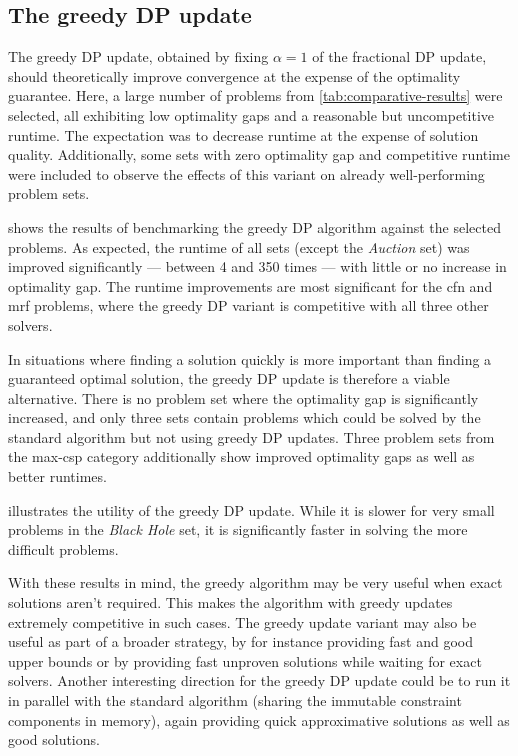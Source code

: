 \subsection{The greedy DP update}
The greedy DP update, obtained by fixing \(\alpha=1\) of the fractional DP update, should theoretically improve convergence at the expense of the optimality guarantee.
Here, a large number of problems from \cref{tab:comparative-results} were selected, all exhibiting low optimality gaps and a reasonable but uncompetitive runtime.
The expectation was to decrease runtime at the expense of solution quality.
Additionally, some sets with zero optimality gap and competitive runtime were included to observe the effects of this variant on already well-performing problem sets.

 shows the results of benchmarking the greedy DP algorithm against the selected problems.
As expected, the runtime of all sets (except the \emph{Auction} set) was improved significantly --- between \num{4} and \num{350} times --- with little or no increase in optimality gap.
The runtime improvements are most significant for the \gls{cfn} and \gls{mrf} problems, where the greedy DP variant is competitive with all three other solvers.

In situations where finding a solution quickly is more important than finding a guaranteed optimal solution, the greedy DP update is therefore a viable alternative.
There is no problem set where the optimality gap is significantly increased, and only three sets contain problems which could be solved by the standard algorithm but not using greedy DP updates.
Three problem sets from the max-\gls{csp} category additionally show improved optimality gaps as well as better runtimes.

 illustrates the utility of the greedy DP update.
While it is slower for very small problems in the \emph{Black Hole} set, it is significantly faster in solving the more difficult problems.


With these results in mind, the greedy algorithm may be very useful when exact solutions aren't required.
This makes the algorithm with greedy updates extremely competitive in such cases.
The greedy update variant may also be useful as part of a broader strategy, by for instance providing fast and good upper bounds or by providing fast unproven solutions while waiting for exact solvers.
Another interesting direction for the greedy DP update could be to run it in parallel with the standard algorithm (sharing the immutable constraint components in memory), again providing quick approximative solutions as well as good solutions.

